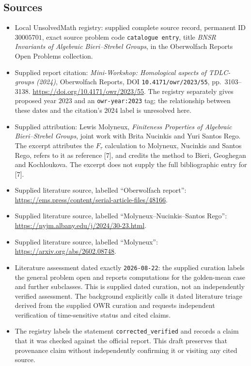 \documentclass[11pt]{article}
\begin{document}
\subsection{Sources}
\begin{itemize}
\item Local UnsolvedMath registry: supplied complete source record, permanent ID \(30005701\), exact source problem code \texttt{catalogue entry}, title \emph{BNSR Invariants of Algebraic Bieri--Strebel Groups}, in the Oberwolfach Reports Open Problems collection.
\item Supplied report citation: \emph{Mini-Workshop: Homological aspects of TDLC-groups (2024)}, Oberwolfach Reports, DOI \texttt{10.4171/owr/2023/55}, pp.\ 3103--3138. \url{https://doi.org/10.4171/owr/2023/55}. The registry separately gives proposed year \(2023\) and an \texttt{owr-year:2023} tag; the relationship between these dates and the citation's \(2024\) label is unresolved here.
\item Supplied attribution: Lewis Molyneux, \emph{Finiteness Properties of Algebraic Bieri--Strebel Groups}, joint work with Brita Nucinkis and Yuri Santos Rego. The excerpt attributes the \(F_\tau\) calculation to Molyneux, Nucinkis and Santos Rego, refers to it as reference [7], and credits the method to Bieri, Geoghegan and Kochloukova. The excerpt does not supply the full bibliographic entry for [7].
\item Supplied literature source, labelled ``Oberwolfach report'': \url{https://ems.press/content/serial-article-files/48166}.
\item Supplied literature source, labelled ``Molyneux--Nucinkis--Santos Rego'': \url{https://nyjm.albany.edu/j/2024/30-23.html}.
\item Supplied literature source, labelled ``Molyneux'': \url{https://arxiv.org/abs/2602.08748}.
\item Literature assessment dated exactly \texttt{2026-08-22}: the supplied curation labels the general problem open and reports computations for the golden-mean case and further subclasses. This is supplied dated curation, not an independently verified assessment. The background explicitly calls it dated literature triage derived from the supplied OWR curation and requests independent verification of time-sensitive status and cited claims.
\item The registry labels the statement \texttt{corrected\_verified} and records a claim that it was checked against the official report. This draft preserves that provenance claim without independently confirming it or visiting any cited source.
\end{itemize}
\end{document}
